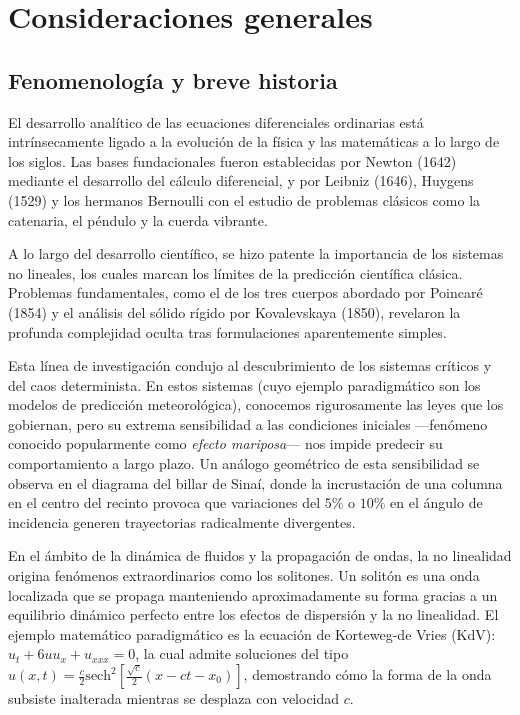 \section{Consideraciones generales}

\subsection{Fenomenología y breve historia}

El desarrollo analítico de las ecuaciones diferenciales ordinarias está intrínsecamente ligado a la evolución de la física y las matemáticas a lo largo de los siglos. Las bases fundacionales fueron establecidas por Newton (1642) mediante el desarrollo del cálculo diferencial, y por Leibniz (1646), Huygens (1529) y los hermanos Bernoulli con el estudio de problemas clásicos como la catenaria, el péndulo y la cuerda vibrante.

A lo largo del desarrollo científico, se hizo patente la importancia de los sistemas no lineales, los cuales marcan los límites de la predicción científica clásica. Problemas fundamentales, como el de los tres cuerpos abordado por Poincaré (1854) y el análisis del sólido rígido por Kovalevskaya (1850), revelaron la profunda complejidad oculta tras formulaciones aparentemente simples. 

Esta línea de investigación condujo al descubrimiento de los sistemas críticos y del caos determinista. En estos sistemas (cuyo ejemplo paradigmático son los modelos de predicción meteorológica), conocemos rigurosamente las leyes que los gobiernan, pero su extrema sensibilidad a las condiciones iniciales —fenómeno conocido popularmente como \textit{efecto mariposa}— nos impide predecir su comportamiento a largo plazo. Un análogo geométrico de esta sensibilidad se observa en el diagrama del billar de Sinaí, donde la incrustación de una columna en el centro del recinto provoca que variaciones del $5\%$ o $10\%$ en el ángulo de incidencia generen trayectorias radicalmente divergentes.

En el ámbito de la dinámica de fluidos y la propagación de ondas, la no linealidad origina fenómenos extraordinarios como los solitones. Un solitón es una onda localizada que se propaga manteniendo aproximadamente su forma gracias a un equilibrio dinámico perfecto entre los efectos de dispersión y la no linealidad. El ejemplo matemático paradigmático es la ecuación de Korteweg-de Vries (KdV): $u_t + 6uu_x + u_{xxx} = 0$, la cual admite soluciones del tipo $u(x,t) = \frac{c}{2} \text{sech}^2\left[ \frac{\sqrt{c}}{2}(x - ct - x_0) \right]$, demostrando cómo la forma de la onda subsiste inalterada mientras se desplaza con velocidad $c$.

